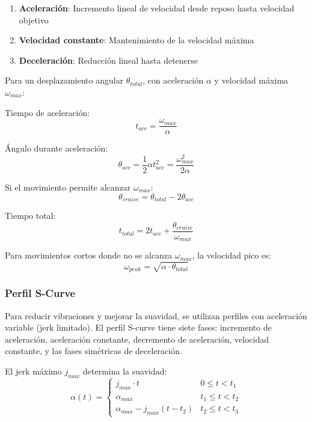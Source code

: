 \begin{enumerate}
    \item \textbf{Aceleración}: Incremento lineal de velocidad desde reposo hasta velocidad objetivo
    \item \textbf{Velocidad constante}: Mantenimiento de la velocidad máxima
    \item \textbf{Deceleración}: Reducción lineal hasta detenerse
\end{enumerate}

Para un desplazamiento angular $\theta_{total}$, con aceleración $\alpha$ y velocidad máxima $\omega_{max}$:

Tiempo de aceleración:
\begin{equation}
t_{acc} = \frac{\omega_{max}}{\alpha}
\end{equation}

Ángulo durante aceleración:
\begin{equation}
\theta_{acc} = \frac{1}{2}\alpha t_{acc}^2 = \frac{\omega_{max}^2}{2\alpha}
\end{equation}

Si el movimiento permite alcanzar $\omega_{max}$:
\begin{equation}
\theta_{cruise} = \theta_{total} - 2\theta_{acc}
\end{equation}

Tiempo total:
\begin{equation}
t_{total} = 2t_{acc} + \frac{\theta_{cruise}}{\omega_{max}}
\end{equation}

Para movimientos cortos donde no se alcanza $\omega_{max}$, la velocidad pico es:
\begin{equation}
\omega_{peak} = \sqrt{\alpha \cdot \theta_{total}}
\end{equation}

\subsubsection{Perfil S-Curve}

Para reducir vibraciones y mejorar la suavidad, se utilizan perfiles con aceleración variable (jerk limitado). El perfil S-curve tiene siete fases: incremento de aceleración, aceleración constante, decremento de aceleración, velocidad constante, y las fases simétricas de deceleración.

El jerk máximo $j_{max}$ determina la suavidad:
\begin{equation}
\alpha(t) = \begin{cases}
j_{max} \cdot t & 0 \leq t < t_1 \\
\alpha_{max} & t_1 \leq t < t_2 \\
\alpha_{max} - j_{max}(t - t_2) & t_2 \leq t < t_3
\end{cases}
\end{equation}

